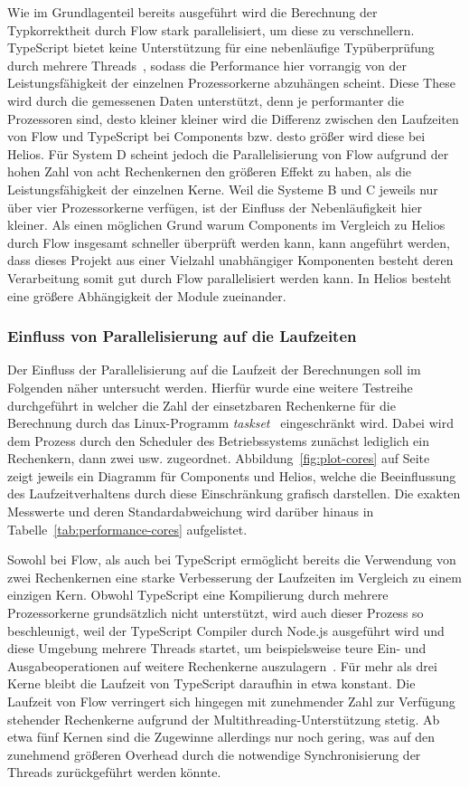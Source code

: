 Wie im Grundlagenteil bereits ausgeführt wird die Berechnung der Typkorrektheit durch Flow stark parallelisiert, um diese zu verschnellern. TypeScript bietet keine Unterstützung für eine nebenläufige Typüberprüfung durch mehrere Threads~\autocite{TS:NO_MULTICORE}, sodass die Performance hier vorrangig von der Leistungsfähigkeit der einzelnen Prozessorkerne abzuhängen scheint. Diese These wird durch die gemessenen Daten unterstützt, denn je performanter die Prozessoren sind, desto kleiner kleiner wird die Differenz zwischen den Laufzeiten von Flow und TypeScript bei Components bzw. desto größer wird diese bei Helios.
Für System D scheint jedoch die Parallelisierung von Flow aufgrund der hohen Zahl von acht Rechenkernen den größeren Effekt zu haben, als die Leistungsfähigkeit der einzelnen Kerne. Weil die Systeme B und C jeweils nur über vier Prozessorkerne verfügen, ist der Einfluss der Nebenläufigkeit hier kleiner. Als einen möglichen Grund warum Components im Vergleich zu Helios durch Flow insgesamt schneller überprüft werden kann, kann angeführt werden, dass dieses Projekt aus einer Vielzahl unabhängiger Komponenten besteht deren Verarbeitung somit gut durch Flow parallelisiert werden kann. In Helios besteht eine größere Abhängigkeit der Module zueinander.

\subsubsection{Einfluss von Parallelisierung auf die Laufzeiten}

Der Einfluss der Parallelisierung auf die Laufzeit der Berechnungen soll im Folgenden näher untersucht werden. Hierfür wurde eine weitere Testreihe durchgeführt in welcher die Zahl der einsetzbaren Rechenkerne für die Berechnung durch das Linux-Programm \textit{taskset}~\autocite{TASKSET} eingeschränkt wird. Dabei wird dem Prozess durch den Scheduler des Betriebssystems zunächst lediglich ein Rechenkern, dann zwei usw. zugeordnet. Abbildung~\ref{fig:plot-cores} auf Seite~\pageref{fig:plot-cores} zeigt jeweils ein Diagramm für Components und Helios, welche die Beeinflussung des Laufzeitverhaltens durch diese Einschränkung grafisch darstellen. Die exakten Messwerte und deren Standardabweichung wird darüber hinaus in Tabelle~\ref{tab:performance-cores} aufgelistet.

Sowohl bei Flow, als auch bei TypeScript ermöglicht bereits die Verwendung von zwei Rechenkernen eine starke Verbesserung der Laufzeiten im Vergleich zu einem einzigen Kern. Obwohl TypeScript eine Kompilierung durch mehrere Prozessorkerne grundsätzlich nicht unterstützt, wird auch dieser Prozess so beschleunigt, weil der TypeScript Compiler durch Node.js ausgeführt wird und diese Umgebung mehrere Threads startet, um beispielsweise teure Ein- und Ausgabeoperationen auf weitere Rechenkerne auszulagern~\autocite{NODE:THREADS}. Für mehr als drei Kerne bleibt die Laufzeit von TypeScript daraufhin in etwa konstant. Die Laufzeit von Flow verringert sich hingegen mit zunehmender Zahl zur Verfügung stehender Rechenkerne aufgrund der Multithreading-Unterstützung stetig. Ab etwa fünf Kernen sind die Zugewinne allerdings nur noch gering, was auf den zunehmend größeren Overhead durch die notwendige Synchronisierung der Threads zurückgeführt werden könnte.

